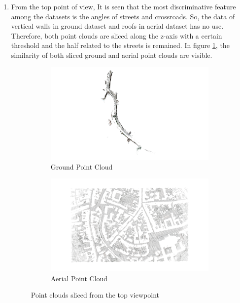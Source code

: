 \documentclass[11pt]{article}
\begin{document}
\begin{enumerate}
        \item From the top point of view, It is seen that the most discriminative feature among the datasets
        is the angles of streets and crossroads. So, the data of vertical walls in ground dataset and roofs
        in aerial dataset has no use. Therefore, both point clouds are sliced along the z-axis with a certain
        threshold and the half related to the streets is remained. In figure \ref{fig:ply_sliced}, the similarity of
        both sliced ground and aerial point clouds are visible.
        \begin{figure}
            \centering
            \begin{subfigure}{0.45\textwidth}
                \centering
                \includegraphics[width=\linewidth]{images/experiment/ply_sliced_ground}
                \caption{Ground Point Cloud}
            \end{subfigure}
            \hfill
            \begin{subfigure}{0.45\textwidth}
                \centering
                \includegraphics[width=\linewidth]{images/experiment/ply_sliced_aerial}
                \caption{Aerial Point Cloud}
            \end{subfigure}
            \caption{Point clouds sliced from the top viewpoint}
            \label{fig:ply_sliced}
        \end{figure}


\end{enumerate}
\end{document}
